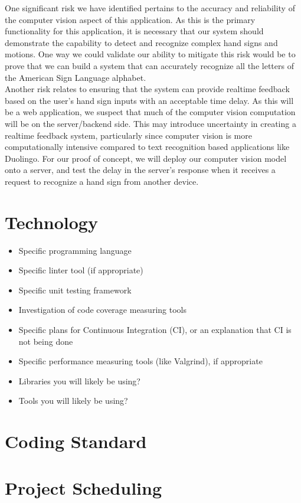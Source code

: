 \documentclass{article}
\begin{document}
One significant risk we have identified pertains to the accuracy and reliability of the computer vision aspect of this application. As this is the
primary functionality for this application, it is necessary that our system should demonstrate the capability to detect and recognize complex
hand signs and motions. One way we could validate our ability to mitigate this risk would be to prove that we can build a 
system that can accurately recognize all the letters of the American Sign Language alphabet.\\
Another risk relates to ensuring that the system can provide realtime feedback based on the user's hand sign inputs with
an acceptable time delay. As this will be a web application, we suspect that much of the computer vision computation will be on the 
server/backend side. This may introduce uncertainty in creating a realtime feedback system, particularly since computer vision is more computationally
intensive compared to text recognition based applications like Duolingo. For our proof of concept, we will deploy our computer vision model
onto a server, and test the delay in the server's response when it receives a request to recognize a hand sign from another device.

\section{Technology}

\begin{itemize}
\item Specific programming language
\item Specific linter tool (if appropriate)
\item Specific unit testing framework
\item Investigation of code coverage measuring tools
\item Specific plans for Continuous Integration (CI), or an explanation that CI
  is not being done
\item Specific performance measuring tools (like Valgrind), if
  appropriate
\item Libraries you will likely be using?
\item Tools you will likely be using?
\end{itemize}

\section{Coding Standard}

\section{Project Scheduling}

\end{document}
